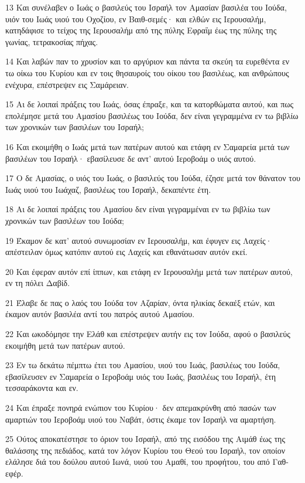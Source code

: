 \par 13 Και συνέλαβεν ο Ιωάς ο βασιλεύς του Ισραήλ τον Αμασίαν βασιλέα του Ιούδα, υιόν του Ιωάς υιού του Οχοζίου, εν Βαιθ-σεμές· και ελθών εις Ιερουσαλήμ, κατηδάφισε το τείχος της Ιερουσαλήμ από της πύλης Εφραΐμ έως της πύλης της γωνίας, τετρακοσίας πήχας.
\par 14 Και λαβών παν το χρυσίον και το αργύριον και πάντα τα σκεύη τα ευρεθέντα εν τω οίκω του Κυρίου και εν τοις θησαυροίς του οίκου του βασιλέως, και ανθρώπους ενέχυρα, επέστρεψεν εις Σαμάρειαν.
\par 15 Αι δε λοιπαί πράξεις του Ιωάς, όσας έπραξε, και τα κατορθώματα αυτού, και πως επολέμησε μετά του Αμασίου βασιλέως του Ιούδα, δεν είναι γεγραμμένα εν τω βιβλίω των χρονικών των βασιλέων του Ισραήλ;
\par 16 Και εκοιμήθη ο Ιωάς μετά των πατέρων αυτού και ετάφη εν Σαμαρεία μετά των βασιλέων του Ισραήλ· εβασίλευσε δε αντ' αυτού Ιεροβοάμ ο υιός αυτού.
\par 17 Ο δε Αμασίας, ο υιός του Ιωάς, ο βασιλεύς του Ιούδα, έζησε μετά τον θάνατον του Ιωάς υιού του Ιωάχαζ, βασιλέως του Ισραήλ, δεκαπέντε έτη.
\par 18 Αι δε λοιπαί πράξεις του Αμασίου δεν είναι γεγραμμέναι εν τω βιβλίω των χρονικών των βασιλέων του Ιούδα;
\par 19 Έκαμον δε κατ' αυτού συνωμοσίαν εν Ιερουσαλήμ, και έφυγεν εις Λαχείς· απέστειλαν όμως κατόπιν αυτού εις Λαχείς και εθανάτωσαν αυτόν εκεί.
\par 20 Και έφεραν αυτόν επί ίππων, και ετάφη εν Ιερουσαλήμ μετά των πατέρων αυτού, εν τη πόλει Δαβίδ.
\par 21 Έλαβε δε πας ο λαός του Ιούδα τον Αζαρίαν, όντα ηλικίας δεκαέξ ετών, και έκαμον αυτόν βασιλέα αντί του πατρός αυτού Αμασίου.
\par 22 Και ωκοδόμησε την Ελάθ και επέστρεψεν αυτήν εις τον Ιούδα, αφού ο βασιλεύς εκοιμήθη μετά των πατέρων αυτού.
\par 23 Εν τω δεκάτω πέμπτω έτει του Αμασίου, υιού του Ιωάς, βασιλέως του Ιούδα, εβασίλευσεν εν Σαμαρεία ο Ιεροβοάμ υιός του Ιωάς, βασιλέως του Ισραήλ, έτη τεσσαράκοντα και εν.
\par 24 Και έπραξε πονηρά ενώπιον του Κυρίου· δεν απεμακρύνθη από πασών των αμαρτιών του Ιεροβοάμ υιού του Ναβάτ, όστις έκαμε τον Ισραήλ να αμαρτήση.
\par 25 Ούτος αποκατέστησε το όριον του Ισραήλ, από της εισόδου της Αιμάθ έως της θαλάσσης της πεδιάδος, κατά τον λόγον Κυρίου του Θεού του Ισραήλ, τον οποίον ελάλησε διά του δούλου αυτού Ιωνά, υιού του Αμαθί, του προφήτου, του από Γαθ-εφέρ.
